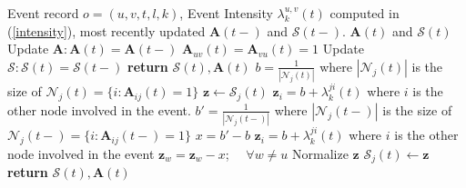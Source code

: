 \documentclass[11pt]{article}
\begin{document}
\begin{algorithm}[h]
   \caption{Update Algorithm for $\mathcal{S}$ and $\mathbf{A}$}
   \label{alg:alg1}
\begin{algorithmic}
    Event record $o = (u, v, t, l, k)$, Event Intensity $\lambda_k^{u,v}(t)$ computed in (\ref{intensity}), most recently updated $\mathbf{A}(t-)$ and $\mathcal{S}(t-)$.
    $\mathbf{A}(t)$ and $\mathcal{S}(t)$   
   \STATE   
    Update $\mathbf{A} : \mathbf{A}(t) = \mathbf{A}(t-)$
   \STATE $\mathbf{A}_{uv}(t) = \mathbf{A}_{vu}(t) = 1$ 
   \ENDIF
   \STATE
    Update $\mathcal{S} : \mathcal{S}(t) = \mathcal{S}(t-) $
   \STATE \textbf{return} $\mathcal{S}(t), \mathbf{A}(t)$
   \ENDIF
   \STATE $b = \frac{1}{|\mathcal{N}_j(t)|}$ where $|\mathcal{N}_j(t)|$ is the size of $\mathcal{N}_j(t) = \{i: \mathbf{A}_{ij}(t) = 1\}$
   \STATE $\mathbf{z} \leftarrow \mathcal{S}_{j}(t)$
   \STATE $\mathbf{z}_i = b + \lambda_k^{ji}(t)$ where $i$ is the other node involved in the event.  
   \STATE $b' = \frac{1}{|\mathcal{N}_j(t-)|}$ where $|\mathcal{N}_j(t-)|$ is the size of $\mathcal{N}_j(t-) = \{i: \mathbf{A}_{ij}(t-) = 1\}$
   \STATE $x = b' - b$
   \STATE $\mathbf{z}_i = b + \lambda_k^{ji}(t)$ where $i$ is the other node involved in the event   
   \STATE $\mathbf{z}_w = \mathbf{z}_w -x$;~~ $\forall w \ne u$
   \ENDIF
   \STATE Normalize $\mathbf{z}$
   \STATE $\mathcal{S}_{j}(t) \leftarrow \mathbf{z}$
   \ENDFOR
   \STATE \textbf{return} $\mathcal{S}(t), \mathbf{A}(t)$
\end{algorithmic}
\end{algorithm}
\end{document}
